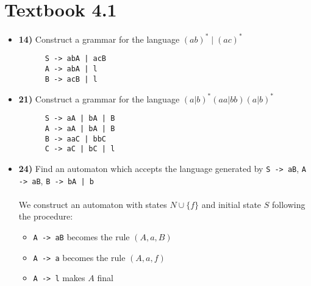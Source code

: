 \documentclass[defaultpackages]{simplereport}
\begin{document}
\section*{Textbook 4.1}
\begin{itemize}[label=]
  \item \textbf{14)} Construct a grammar for the language $(ab)^* \mid (ac)^*$
    \begin{lstlisting}
      S -> abA | acB
      A -> abA | l
      B -> acB | l
      \end{lstlisting}
  \item \textbf{21)} Construct a grammar for the language $(a | b)^*(aa | bb)(a|b)^*$
    \begin{lstlisting}
      S -> aA | bA | B
      A -> aA | bA | B
      B -> aaC | bbC
      C -> aC | bC | l
      \end{lstlisting}
   \item \textbf{24)} Find an automaton which accepts the language generated by
     \lstinline{S -> aB}, \lstinline{A -> aB}, \lstinline{B -> bA | b}\\\\
    We construct an automaton with states $N \cup \{f\}$ and initial state $S$
    following the procedure:
    \begin{itemize}[label=$\cdot$]
    \item \lstinline{A -> aB} becomes the rule $(A, a, B)$
    \item \lstinline{A -> a} becomes the rule $(A, a, f)$
      \item \lstinline{A -> l} makes $A$ final
      \end{itemize}
    \begin{figure}[H]
     \centering
\end{figure}
\end{itemize}
\end{document}
